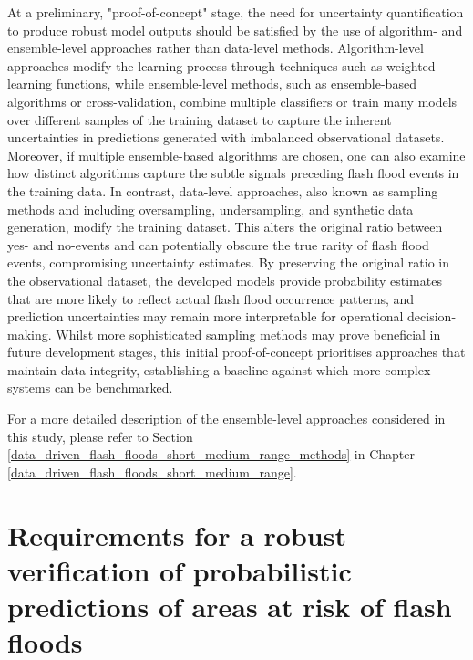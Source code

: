 At  a preliminary, "proof-of-concept" stage, the need for uncertainty quantification to produce robust model outputs should be satisfied by the use of algorithm- and ensemble-level approaches rather than data-level methods. Algorithm-level approaches modify the learning process through techniques such as weighted learning functions, while ensemble-level methods, such as ensemble-based algorithms or cross-validation, combine multiple classifiers or train many models over different samples of the training dataset to capture the inherent uncertainties in predictions generated with imbalanced observational datasets. Moreover, if multiple ensemble-based algorithms are chosen, one can also examine how distinct algorithms capture the subtle signals preceding flash flood events in the training data. In contrast, data-level approaches, also known as sampling methods and including oversampling, undersampling, and synthetic data generation, modify the training dataset. This alters the original ratio between yes- and no-events and can potentially obscure the true rarity of flash flood events, compromising uncertainty estimates. By preserving the original ratio in the observational dataset, the developed models provide probability estimates that are more likely to reflect actual flash flood occurrence patterns, and prediction uncertainties may remain more interpretable for operational decision-making. Whilst more sophisticated sampling methods may prove beneficial in future development stages, this initial proof-of-concept prioritises approaches that maintain data integrity, establishing a baseline against which more complex systems can be benchmarked. 

For a more detailed description of the ensemble-level approaches considered in this study, please refer to Section \ref{data_driven_flash_floods_short_medium_range_methods} in Chapter \ref{data_driven_flash_floods_short_medium_range}.


\section{Requirements for a robust verification of probabilistic predictions of areas at risk of flash floods}
\label{integrated_experimental_strategy_verification_strategy}

